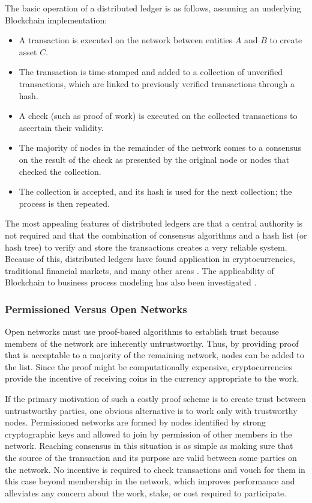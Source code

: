 The basic operation of a distributed ledger is as follows, assuming an
underlying Blockchain implementation:
\begin{itemize}
    \item A transaction is executed on the network between entities $A$ and $B$
    to create asset $C$.
    \item The transaction is time-stamped and added to a collection of
    unverified transactions, which are linked to previously verified
    transactions through a hash.
    \item A check (such as proof of work) is executed on the collected
    transactions to ascertain their validity.
    \item The majority of nodes in the remainder of the network comes to a
    consensus on the result of the check as presented by the original node or
    nodes that checked the collection.
    \item The collection is accepted, and its hash is used for the next
    collection; the process is then repeated.
\end{itemize}

The most appealing features of distributed ledgers are that a central authority
is not required and that the combination of consensus algorithms and a hash list
(or hash tree) to verify and store the transactions creates a very reliable
system. Because of this, distributed ledgers have found application in
cryptocurrencies, traditional financial markets, and many other areas
\cite{noauthor_groups:requirements:use-case-inventory_nodate}
\cite{noauthor_discussion_2018}. The applicability of Blockchain to business
process modeling has also been investigated
\cite{mendling_blockchains_2018}.

\subsubsection{Permissioned Versus Open Networks}
Open networks must use proof-based algorithms to establish trust because members
of the network are inherently untrustworthy. Thus, by providing proof that is
acceptable to a majority of the remaining network, nodes can be added to the
list. Since the proof might be computationally expensive, cryptocurrencies
provide the incentive of receiving coins in the currency appropriate to the
work.

If the primary motivation of such a costly proof scheme is to create trust
between untrustworthy parties, one obvious alternative is to work only with
trustworthy nodes. Permissioned networks are formed by nodes identified by
strong cryptographic keys and allowed to join by permission of other members in
the network. Reaching consensus in this situation is as simple as making sure
that the source of the transaction and its purpose are valid between some
parties on the network. No incentive is required to check transactions and vouch
for them in this case beyond membership in the network, which improves
performance and alleviates any concern about the work, stake, or cost required
to participate.

